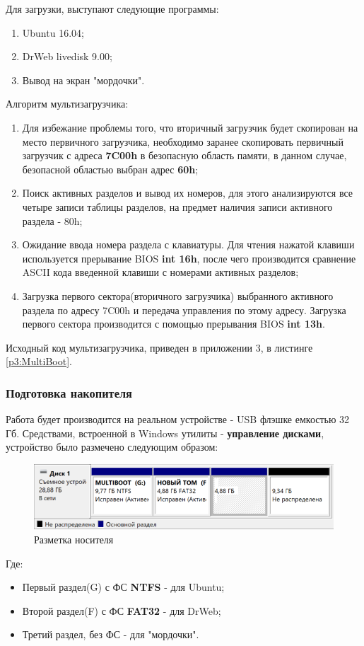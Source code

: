 Для загрузки, выступают следующие программы:
\begin{enumerate}
\item Ubuntu 16.04;
\item DrWeb livedisk 9.00;
\item Вывод на экран "мордочки".
\end{enumerate}
Алгоритм мультизагрузчика:
\begin{enumerate}
\item Для избежание проблемы того, что вторичный загрузчик будет скопирован на место первичного загрузчика, необходимо заранее скопировать первичный загрузчик с адреса \textbf{7C00h} в безопасную область памяти, в данном случае, безопасной областью выбран адрес \textbf{60h};
\item Поиск активных разделов и вывод их номеров, для этого анализируются все четыре записи таблицы разделов, на предмет наличия записи активного раздела - 80h;
\item Ожидание ввода номера раздела с клавиатуры. Для чтения нажатой клавиши используется прерывание BIOS \textbf{int 16h}, после чего производится сравнение ASCII кода введенной клавиши с номерами активных разделов;
\item Загрузка первого сектора(вторичного загрузчика) выбранного активного раздела по адресу 7C00h  и передача управления по этому адресу. Загрузка первого сектора производится с помощью прерывания BIOS \textbf{int 13h}.
\end{enumerate}
Исходный код мультизагрузчика, приведен в приложении 3, в листинге \ref{p3:MultiBoot}.

\subsubsection{Подготовка накопителя}
Работа будет производится на реальном устройстве - USB флэшке емкостью 32 Гб. Средствами, встроенной в Windows утилиты - \textbf{управление дисками}, устройство было размечено следующим образом:
\begin{figure}[H]
  \centering
  \includegraphics[width=\textwidth]{img/p3/usbArch}
  \caption{Разметка носителя}
\end{figure}
Где:
\begin{itemize}
\item Первый раздел(G) с ФС \textbf{NTFS} - для Ubuntu;
\item Второй раздел(F) с ФС \textbf{FAT32} - для DrWeb;
\item Третий раздел, без ФС - для "мордочки".
\end{itemize}


